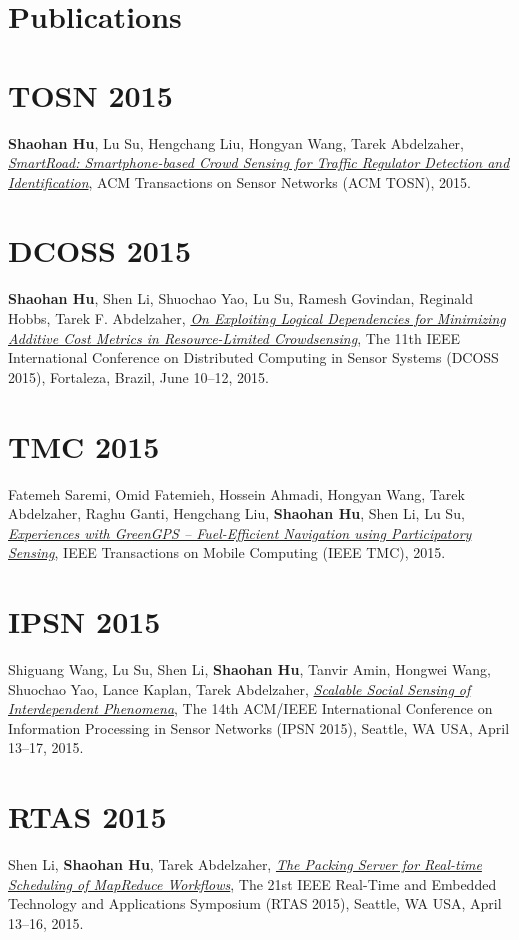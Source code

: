 \section{\sc Publications}

\section{\sc TOSN 2015}\hypertarget{hu2015tosn}{} \textbf{Shaohan Hu}, Lu Su, Hengchang Liu, Hongyan Wang, Tarek Abdelzaher, \href{}{\emph{SmartRoad: Smartphone-based Crowd Sensing for Traffic Regulator Detection and Identification}}, \textsf{ACM Transactions on Sensor Networks (ACM TOSN)}, 2015.

\section{\sc DCOSS 2015}\hypertarget{hu2015dcoss}{} \textbf{Shaohan Hu}, Shen Li, Shuochao Yao, Lu Su, Ramesh Govindan, Reginald Hobbs, Tarek F. Abdelzaher, \href{}{\emph{On Exploiting Logical Dependencies for Minimizing Additive Cost Metrics in Resource-Limited Crowdsensing}}, \textsf{The 11th IEEE International Conference on Distributed Computing in Sensor Systems (DCOSS 2015)}, Fortaleza, Brazil, June 10--12, 2015.

\section{\sc TMC 2015}\hypertarget{saremi2015tmc}{} Fatemeh Saremi, Omid Fatemieh, Hossein Ahmadi, Hongyan Wang, Tarek Abdelzaher, Raghu Ganti, Hengchang Liu, \textbf{Shaohan Hu}, Shen Li, Lu Su, \href{}{\emph{Experiences with GreenGPS -- Fuel-Efficient Navigation using Participatory Sensing}}, \textsf{IEEE Transactions on Mobile Computing (IEEE TMC)}, 2015.

\section{\sc IPSN 2015}\hypertarget{wang2015ipsn}{} Shiguang Wang, Lu Su, Shen Li, \textbf{Shaohan Hu}, Tanvir Amin, Hongwei Wang, Shuochao Yao, Lance Kaplan, Tarek Abdelzaher, \href{}{\emph{Scalable Social Sensing of Interdependent Phenomena}}, \textsf{The 14th ACM/IEEE International Conference on Information Processing in Sensor Networks (IPSN 2015)}, Seattle, WA USA, April 13--17, 2015.

\section{\sc RTAS 2015}\hypertarget{li2015rtas}{} Shen Li, \textbf{Shaohan Hu}, Tarek Abdelzaher, \href{}{\emph{The Packing Server for Real-time Scheduling of MapReduce Workflows}}, \textsf{The 21st IEEE Real-Time and Embedded Technology and Applications Symposium (RTAS 2015)}, Seattle, WA USA, April 13--16, 2015.

